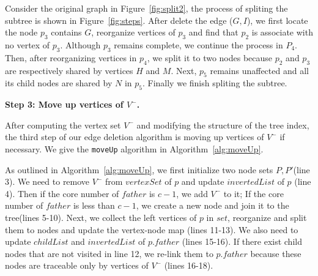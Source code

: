 \begin{example}
\label{em:steps}
Consider the original graph in Figure~\ref{fig:split2}, the process of spliting the subtree is shown in Figure~\ref{fig:steps}. After delete the edge ($G,I$), we first locate the node $p_3$ contains $G$, reorganize vertices of $p_3$ and find that $p_2$ is associate with no vertex of $p_3$. Although $p_3$ remains complete, we continue the process in $P_4$. Then, after reorganizing vertices in $p_4$, we split it to two nodes because $p_2$ and $p_3$ are respectively shared by vertices $H$ and $M$. Next, $p_5$ remains unaffected and all its child nodes are shared by $N$ in $p_5$. Finally we finish spliting the subtree.  
\end{example}




\textbf{Step 3: Move up vertices of $V^-$.}

After computing the vertex set $V^-$ and modifying the structure of the tree index, the third step of our edge deletion algorithm is moving up vertices of $V^-$ if necessary. We give the {\tt moveUp} algorithm in Algorithm~\ref{alg:moveUp}.

As outlined in Algorithm~\ref{alg:moveUp}, we first initialize two node sets $P,P'$(line 3). We need to remove $V^-$ from $vertexSet$ of $p$ and update $invertedList$ of $p$ (line 4). Then if the core number of $father$ is $c-1$, we add $V^-$ to it; If the core number of $father$ is less than $c-1$, we create a new node and join it to the tree(lines 5-10). Next, we collect the left vertices of $p$ in $set$, reorganize and split them to nodes and update the vertex-node map (lines 11-13). We also need to update $childList$ and $invertedList$ of $p.father$ (lines 15-16). If there exist child nodes that are not visited in line 12, we re-link them to $p.father$ because these nodes are traceable only by vertices of $V^-$ (lines 16-18).


